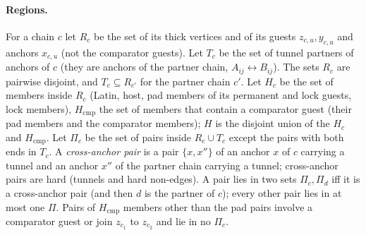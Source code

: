 \paragraph{Regions.} For a chain $c$ let $R_c$ be the set of its thick vertices and of its guests $z_{c,u},y_{c,u}$ and anchors $x_{c,u}$ (not the comparator guests). Let $T_c$ be the set of tunnel partners of anchors of $c$ (they are anchors of the partner chain, $A_{ij}\leftrightarrow B_{ij}$). The sets $R_c$ are pairwise disjoint, and $T_c\subseteq R_{c'}$ for the partner chain $c'$. Let $H_c$ be the set of members inside $R_c$ (Latin, host, pad members of its permanent and lock guests, lock members), $H_{\mathrm{cmp}}$ the set of members that contain a comparator guest (their pad members and the comparator members); $H$ is the disjoint union of the $H_c$ and $H_{\mathrm{cmp}}$. Let $\Pi_c$ be the set of pairs inside $R_c\cup T_c$ except the pairs with both ends in $T_c$. A \emph{cross-anchor pair} is a pair $\{x,x''\}$ of an anchor $x$ of $c$ carrying a tunnel and an anchor $x''$ of the partner chain carrying a tunnel; cross-anchor pairs are hard (tunnels and hard non-edges). A pair lies in two sets $\Pi_c,\Pi_{d}$ iff it is a cross-anchor pair (and then $d$ is the partner of $c$); every other pair lies in at most one $\Pi$. Pairs of $H_{\mathrm{cmp}}$ members other than the pad pairs involve a comparator guest or join $z_{c_1}$ to $z_{c_2}$ and lie in no $\Pi_c$.

